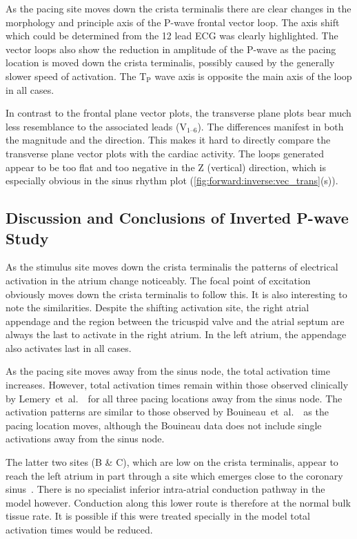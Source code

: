 As the pacing site moves down the crista terminalis there are clear changes in
the morphology and principle axis of the P-wave frontal vector loop.
The axis shift which could be determined from the 12 lead ECG was clearly
highlighted.
The vector loops also show the reduction in amplitude of the P-wave as the
pacing location is moved down the crista terminalis, possibly caused by the
generally slower speed of activation.
The $\text{T}_{\text{P}}$ wave axis is opposite the main axis of the loop in all
cases.

In contrast to the frontal plane vector plots, the transverse plane plots bear
much less resemblance to the associated leads ($\text{V}_{\text{1--6}}$).
The differences manifest in both the magnitude and the direction.
This makes it hard to directly compare the transverse plane vector plots with
the cardiac activity.
The loops generated appear to be too flat and too negative in the Z (vertical)
direction, which is especially obvious in the sinus rhythm plot
(\ref{fig:forward:inverse:vec_trans}(s)).

\subsection{Discussion and Conclusions of Inverted P-wave Study}

As the stimulus site moves down the crista terminalis the patterns of electrical
activation in the atrium change noticeably.
The focal point of excitation obviously moves down the crista terminalis to
follow this.
It is also interesting to note the similarities.
Despite the shifting activation site, the right atrial appendage and the region
between the tricuspid valve and the atrial septum are always the last to
activate in the right atrium.
In the left atrium, the appendage also activates last in all cases.

As the pacing site moves away from the sinus node, the total activation time
increases.
However, total activation times remain within those observed clinically by
Lemery~et~al.~\cite{Lemery2004}\ for all three pacing locations away from the
sinus node.
The activation patterns are similar to those observed by
Bouineau~et~al.~\cite{Bouineau1988}\ as the pacing location moves, although the
Bouineau data does not include single activations away from the sinus node.

The latter two sites (B \& C), which are low on the crista terminalis, appear to
reach the left atrium in part through a site which emerges close to the coronary
sinus~\cite{Platonov2007,Platonov2008,Markides2003,Lemery2004}.
There is no specialist inferior intra-atrial conduction pathway in the model
however.
Conduction along this lower route is therefore at the normal bulk tissue rate.
It is possible if this were treated specially in the model total activation
times would be reduced.

